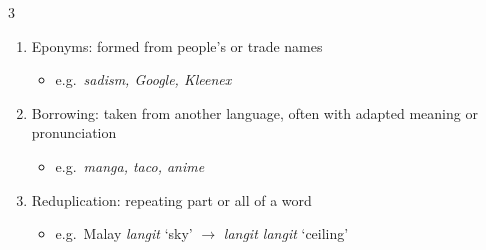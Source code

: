 \documentclass[12pt, a4paper]{article}
\begin{document}
\begin{multicols*}{3}
\begin{enumerate}[\roman*.]
    \begin{itemize}[leftmargin=*]\vspace{3pt}
      \item e.g.\ MRT, NUS, KFC
    \end{itemize}
  \item Eponyms: formed from people's or trade names
    \begin{itemize}[leftmargin=*]\vspace{3pt}
      \item e.g.\ \textit{sadism, Google, Kleenex}
    \end{itemize}
  \item Borrowing: taken from another language, often with adapted meaning or pronunciation
    \begin{itemize}[leftmargin=*]\vspace{3pt}
      \item e.g.\ \textit{manga, taco, anime}
    \end{itemize}
  \item Reduplication: repeating part or all of a word
    \begin{itemize}[leftmargin=*]\vspace{3pt}
      \item e.g.\ Malay \textit{langit} `sky' $\to$ \textit{langit langit} `ceiling'
    \end{itemize}
\end{enumerate}

\colbreak

\end{multicols*}
\end{document}
